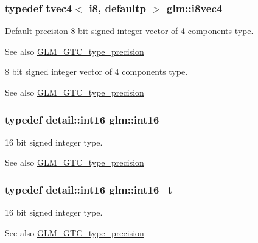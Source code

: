 \subsubsection[{i8vec4}]{\setlength{\rightskip}{0pt plus 5cm}typedef tvec4$<$ i8, defaultp $>$ {\bf glm\+::i8vec4}}\label{group__gtc__type__precision_gafbf10a778016eba57d44beb585f2dc49}
Default precision 8 bit signed integer vector of 4 components type. \begin{DoxySeeAlso}{See also}
\hyperlink{group__gtc__type__precision}{G\+L\+M\+\_\+\+G\+T\+C\+\_\+type\+\_\+precision}
\end{DoxySeeAlso}
8 bit signed integer vector of 4 components type. \begin{DoxySeeAlso}{See also}
\hyperlink{group__gtc__type__precision}{G\+L\+M\+\_\+\+G\+T\+C\+\_\+type\+\_\+precision} 
\end{DoxySeeAlso}
\hypertarget{group__gtc__type__precision_ga2945a61d12771f8954994fcddf02b021}{}
\subsubsection[{int16}]{\setlength{\rightskip}{0pt plus 5cm}typedef detail\+::int16 {\bf glm\+::int16}}\label{group__gtc__type__precision_ga2945a61d12771f8954994fcddf02b021}
16 bit signed integer type. \begin{DoxySeeAlso}{See also}
\hyperlink{group__gtc__type__precision}{G\+L\+M\+\_\+\+G\+T\+C\+\_\+type\+\_\+precision} 
\end{DoxySeeAlso}
\hypertarget{group__gtc__type__precision_gaf89ee61e0d34aa4a462104b7ae7f2da6}{}
\subsubsection[{int16\+\_\+t}]{\setlength{\rightskip}{0pt plus 5cm}typedef {\bf detail\+::int16} {\bf glm\+::int16\+\_\+t}}\label{group__gtc__type__precision_gaf89ee61e0d34aa4a462104b7ae7f2da6}
16 bit signed integer type. \begin{DoxySeeAlso}{See also}
\hyperlink{group__gtc__type__precision}{G\+L\+M\+\_\+\+G\+T\+C\+\_\+type\+\_\+precision} 
\end{DoxySeeAlso}
\hypertarget{group__gtc__type__precision_ga632d8b25f6b61659f39ea4321fab92a4}{}
